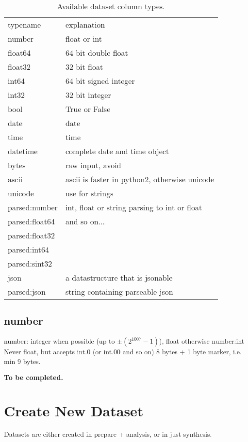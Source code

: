 \begin{table}[h!]
 \begin{tabular}{ll}
  \hline
    typename  & explanation \\[1ex]
    number    &  float or int\\
    float64   &  64 bit double float\\
    float32   &  32 bit float\\
    int64     &  64 bit signed integer\\
    int32     &  32 bit integer\\
    bool      &  True or False\\
    date      &  date\\
    time      &  time\\
    datetime  &  complete date and time object\\
    bytes     &  raw input, avoid \\
    ascii     &  ascii is faster in python2, otherwise unicode\\
    unicode   &  use for strings\\
    parsed:number   & int, float or string parsing to int or float \\
    parsed:float64  &  and so on...\\
    parsed:float32  &  \\
    parsed:int64    &  \\
    parsed:sint32   &  \\
    json            &  a datastructure that is jsonable\\
    parsed:json     &  string containing parseable json\\
  \hline
 \end{tabular}
 \caption{Available dataset column types.}
\end{table}


\subsection{number}
number: integer when possible (up to $\pm (2^{1007}-1)$), float
otherwise number:int Never float, but accepts int.0 (or int.00 and so
on) 8 bytes + 1 byte marker, i.e. min 9 bytes.



\textbf{To be completed.}


\newpage
\section{Create New Dataset}
Datasets are either created in prepare + analysis, or in just
synthesis.

